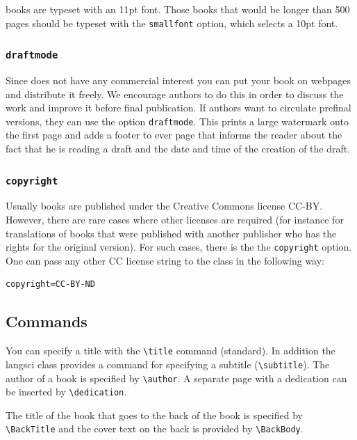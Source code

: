 \lsp{} books are typeset with an 11pt font. Those books that would be longer than 500 pages should be
typeset with the \texttt{smallfont} option, which selects a 10pt font.

\subsubsection{\texttt{draftmode}}

Since \lsp does not have any commercial interest you can put your book on webpages and distribute it
freely. We encourage authors to do this in order to discuss the work and improve it before final
publication. If authors want to circulate prefinal versions, they can use the option
\texttt{draftmode}. This prints a large watermark onto the first page and adds a footer to ever page
that informs the reader about the fact that he is reading a draft and the date and time of the
creation of the draft.


\subsubsection{\texttt{copyright}}

Usually \lsp books are published under the Creative Commons license CC-BY. However, there are rare
cases where other licenses are required (for instance for translations of books that were published
with another publisher who has the rights for the original version). For such cases, there is the
 the \texttt{copyright} option. One can pass any other CC license string to the
\latex class in the following way:
\begin{verbatim}
copyright=CC-BY-ND
\end{verbatim}


\subsection{Commands}

You can specify a title with the \verb+\title+ command (\latex standard). In addition the langsci
class provides a command for specifying a subtitle (\verb+\subtitle+). The author of a book is
specified by \verb+\author+. A separate page with a dedication can be inserted by \verb+\dedication+.

The title of the book that goes to the back of the book is specified by \verb+\BackTitle+ and the
cover text on the back is provided by \verb+\BackBody+.


